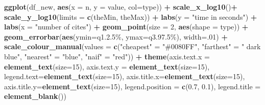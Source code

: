 \documentclass[
]{article}
\newenvironment{Shaded}{\begin{snugshade}}{\end{snugshade}}
\newcommand{\AttributeTok}[1]{\textcolor[rgb]{0.13,0.29,0.53}{#1}}
\newcommand{\DecValTok}[1]{\textcolor[rgb]{0.00,0.00,0.81}{#1}}
\newcommand{\FloatTok}[1]{\textcolor[rgb]{0.00,0.00,0.81}{#1}}
\newcommand{\FunctionTok}[1]{\textcolor[rgb]{0.13,0.29,0.53}{\textbf{#1}}}
\newcommand{\NormalTok}[1]{#1}
\newcommand{\OtherTok}[1]{\textcolor[rgb]{0.56,0.35,0.01}{#1}}
\newcommand{\SpecialCharTok}[1]{\textcolor[rgb]{0.81,0.36,0.00}{\textbf{#1}}}
\newcommand{\StringTok}[1]{\textcolor[rgb]{0.31,0.60,0.02}{#1}}
\begin{document}
\begin{Shaded}
\begin{Highlighting}[]
\FunctionTok{ggplot}\NormalTok{(df\_new, }\FunctionTok{aes}\NormalTok{(}\AttributeTok{x =}\NormalTok{ n, }\AttributeTok{y =}\NormalTok{ value, }\AttributeTok{col=}\NormalTok{type)) }\SpecialCharTok{+}  \FunctionTok{scale\_x\_log10}\NormalTok{()}\SpecialCharTok{+}
  \FunctionTok{scale\_y\_log10}\NormalTok{(}\AttributeTok{limits =} \FunctionTok{c}\NormalTok{(theMin, theMax))  }\SpecialCharTok{+}
  \FunctionTok{labs}\NormalTok{(}\AttributeTok{y =} \StringTok{"time in seconds"}\NormalTok{) }\SpecialCharTok{+}  \FunctionTok{labs}\NormalTok{(}\AttributeTok{x =} \StringTok{"number of cites"}\NormalTok{) }\SpecialCharTok{+}
  \FunctionTok{geom\_point}\NormalTok{(}\AttributeTok{size =} \DecValTok{2}\NormalTok{, }\FunctionTok{aes}\NormalTok{(}\AttributeTok{shape =}\NormalTok{ type)) }\SpecialCharTok{+}
  \FunctionTok{geom\_errorbar}\NormalTok{(}\FunctionTok{aes}\NormalTok{(}\AttributeTok{ymin=}\StringTok{\textasciigrave{}}\AttributeTok{q1.2.5\%}\StringTok{\textasciigrave{}}\NormalTok{, }\AttributeTok{ymax=}\StringTok{\textasciigrave{}}\AttributeTok{q3.97.5\%}\StringTok{\textasciigrave{}}\NormalTok{), }\AttributeTok{width=}\NormalTok{.}\DecValTok{01}\NormalTok{) }\SpecialCharTok{+}
  \FunctionTok{scale\_colour\_manual}\NormalTok{(}\AttributeTok{values =} \FunctionTok{c}\NormalTok{(}\StringTok{"cheapest"} \OtherTok{=} \StringTok{"\#0080FF"}\NormalTok{,}
                                 \StringTok{"farthest"} \OtherTok{=} \StringTok{" dark blue"}\NormalTok{, }\StringTok{"nearest"} \OtherTok{=} \StringTok{"blue"}\NormalTok{, }\StringTok{"naif"} \OtherTok{=} \StringTok{"red"}\NormalTok{)) }\SpecialCharTok{+}
  \FunctionTok{theme}\NormalTok{(}\AttributeTok{axis.text.x =} \FunctionTok{element\_text}\NormalTok{(}\AttributeTok{size=}\DecValTok{15}\NormalTok{),}
        \AttributeTok{axis.text.y =} \FunctionTok{element\_text}\NormalTok{(}\AttributeTok{size=}\DecValTok{15}\NormalTok{),}
        \AttributeTok{legend.text=}\FunctionTok{element\_text}\NormalTok{(}\AttributeTok{size=}\DecValTok{15}\NormalTok{),}
        \AttributeTok{axis.title.x=}\FunctionTok{element\_text}\NormalTok{(}\AttributeTok{size=}\DecValTok{15}\NormalTok{),}
        \AttributeTok{axis.title.y=}\FunctionTok{element\_text}\NormalTok{(}\AttributeTok{size=}\DecValTok{15}\NormalTok{),}
        \AttributeTok{legend.position =} \FunctionTok{c}\NormalTok{(}\FloatTok{0.7}\NormalTok{, }\FloatTok{0.1}\NormalTok{),}
        \AttributeTok{legend.title =} \FunctionTok{element\_blank}\NormalTok{())}
\end{Highlighting}
\end{Shaded}
\end{document}
